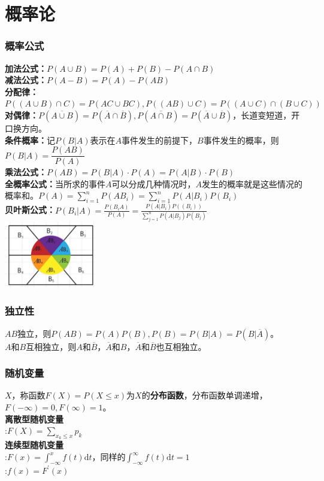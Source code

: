 \documentclass[a4paper]{book}
\begin{document}
\section{概率论}
\subsubsection{概率公式}
\indent\textbf{加法公式：}$P(A\cup B)=P(A)+P(B)-P(A\cap B)$\\
\indent\textbf{减法公式：}$P(A-B)=P(A)-P(AB)$\\
\indent\textbf{分配律：}$P((A\cup B)\cap C)=P(AC\cup BC),P((AB)\cup C)=P((A\cup C)\cap(B\cup C))$\\
\indent\textbf{对偶律：}$P(\overline{A\cup B})=P(\overline{A}\cap \overline{B}),P(\overline{A\cap B})=P(\overline{A}\cup \overline{B})$，长道变短道，开口换方向。\\
\indent\textbf{条件概率：}记$P(B|A)$表示在$A$事件发生的前提下，$B$事件发生的概率，则$P(B|A)=\dfrac{P(AB)}{P(A)}$\\
\indent\textbf{乘法公式：}$P(AB)=P(B|A)\cdot P(A)=P(A|B)\cdot P(B)$\\
\indent\textbf{全概率公式：}当所求的事件$A$可以分成几种情况时，$A$发生的概率就是这些情况的概率和。$\displaystyle P(A)=\sum_{i=1}^{n}P(AB_{i})=\sum_{i=1}^{n}P(A|B_{i})P(B_{i})$\\
\indent\textbf{贝叶斯公式：}$\displaystyle P(B_{i}|A)=\frac{P(B_{i}A)}{P(A)}=\frac{P(A|B_{i})P((B_i))}{\displaystyle \sum_{j=1}^{n}P(A|B_j)P(B_j)}$\\
\includegraphics[width=0.3\textwidth,center]{../photo/quangailv.png}
\subsubsection{独立性}
$AB$独立，则$P(AB)=P(A)P(B),P(B)=P(B|A)=P(B|\overline{A})$。\\
\indent$A$和$B$互相独立，则$A$和$\overline{B}$，$\overline{A}$和$B$，$\overline{A}$和$\overline{B}$也互相独立。\\
\subsubsection{随机变量}
$X$，称函数$F(X)=P(X\leq x)$为$X$的\textbf{分布函数}，分布函数单调递增，$F(-\infty)=0,F(\infty)=1$。\\
\noindent\textbf{离散型随机变量}\\
:$F(X)=\displaystyle\sum_{x_{k}\leq x}p_k$\\
\noindent\textbf{连续型随机变量}\\
:$F(x)=\int_{-\infty}^{x}f(t)\text{d}t$，同样的$\int_{-\infty}^{\infty}f(t)\text{d}t=1$\\
:$f(x)=F^{\prime}(x)$
\end{document}
